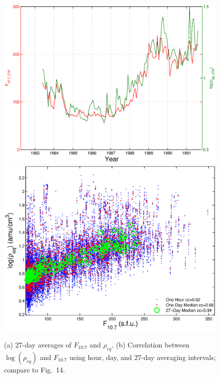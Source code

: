 \documentclass[10pt,twocolumn]{article}
\begin{document}
\begin{figure}[htp!]
\centering
\includegraphics[scale=0.40]{paperfigures/F107MDAllData.eps}
\includegraphics[scale=0.40]{paperfigures/ccplot.eps}
\caption{(a) 27-day averages of $F_{10.7}$ and $\rho_{eq}$. (b) Correlation between $\log(\rho_{eq})$ and $F_{10.7}$ using hour, day, and 27-day averaging intervals; compare to \cite{Takahashi2010} Fig.~14.}
\label{ccplot}
\end{figure}
\clearpage
\end{document}
